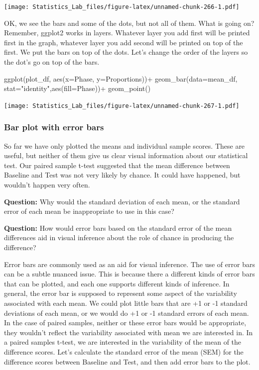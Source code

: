 \documentclass[
]{book}
\newenvironment{Shaded}{\begin{snugshade}}{\end{snugshade}}
\newcommand{\AttributeTok}[1]{\textcolor[rgb]{0.77,0.63,0.00}{#1}}
\newcommand{\FunctionTok}[1]{\textcolor[rgb]{0.00,0.00,0.00}{#1}}
\newcommand{\NormalTok}[1]{#1}
\newcommand{\SpecialCharTok}[1]{\textcolor[rgb]{0.00,0.00,0.00}{#1}}
\newcommand{\StringTok}[1]{\textcolor[rgb]{0.31,0.60,0.02}{#1}}
\begin{document}
\texttt{[image: Statistics\_Lab\_files/figure-latex/unnamed-chunk-266-1.pdf]}

OK, we see the bars and some of the dots, but not all of them. What is going on? Remember, ggplot2 works in layers. Whatever layer you add first will be printed first in the graph, whatever layer you add second will be printed on top of the first. We put the bars on top of the dots. Let's change the order of the layers so the dot's go on top of the bars.

\begin{Shaded}
\begin{Highlighting}[]
\FunctionTok{ggplot}\NormalTok{(plot\_df, }\FunctionTok{aes}\NormalTok{(}\AttributeTok{x=}\NormalTok{Phase, }\AttributeTok{y=}\NormalTok{Proportions))}\SpecialCharTok{+} 
  \FunctionTok{geom\_bar}\NormalTok{(}\AttributeTok{data=}\NormalTok{mean\_df, }\AttributeTok{stat=}\StringTok{"identity"}\NormalTok{,}\FunctionTok{aes}\NormalTok{(}\AttributeTok{fill=}\NormalTok{Phase))}\SpecialCharTok{+}
  \FunctionTok{geom\_point}\NormalTok{()}
\end{Highlighting}
\end{Shaded}

\texttt{[image: Statistics\_Lab\_files/figure-latex/unnamed-chunk-267-1.pdf]}

\hypertarget{bar-plot-with-error-bars}{%
\subsubsection{Bar plot with error bars}\label{bar-plot-with-error-bars}}

So far we have only plotted the means and individual sample scores. These are useful, but neither of them give us clear visual information about our statistical test. Our paired sample t-test suggested that the mean difference between Baseline and Test was not very likely by chance. It could have happened, but wouldn't happen very often.

\textbf{Question:} Why would the standard deviation of each mean, or the standard error of each mean be inappropriate to use in this case?

\textbf{Question:} How would error bars based on the standard error of the mean differences aid in visual inference about the role of chance in producing the difference?

Error bars are commonly used as an aid for visual inference. The use of error bars can be a subtle nuanced issue. This is because there a different kinds of error bars that can be plotted, and each one supports different kinds of inference. In general, the error bar is supposed to represent some aspect of the variability associated with each mean. We could plot little bars that are +1 or -1 standard deviations of each mean, or we would do +1 or -1 standard errors of each mean. In the case of paired samples, neither or these error bars would be appropriate, they wouldn't reflect the variability associated with mean we are interested in. In a paired samples t-test, we are interested in the variability of the mean of the difference scores. Let's calculate the standard error of the mean (SEM) for the difference scores between Baseline and Test, and then add error bars to the plot.
\end{document}
